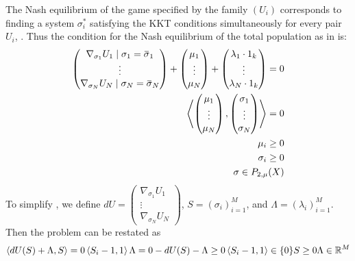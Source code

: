 The Nash equilibrium of the game specified by the family $(U_i)$ corresponds to finding a system $\sigma_i^*$ satisfying the KKT conditions simultaneously for every pair $U_i$, \citep{deimling2010nonlinear}. Thus the condition for the Nash equilibrium of the total population as in  is:
\begin{equation}
  \begin{split}
  \begin{pmatrix}
    \nabla_{\sigma_1} U_1 \mid{\sigma_1 = \overbar{\sigma}_1} \\
    \vdots \\
    \nabla_{\sigma_N} U_N \mid{\sigma_N = \overbar{\sigma}_N}
\end{pmatrix} + \begin{pmatrix}
    \mu_1 \\
    \vdots \\
    \mu_N
\end{pmatrix} + \begin{pmatrix}
    \lambda_1 \cdot 1_k \\
    \vdots \\
    \lambda_N \cdot 1_k
\end{pmatrix} = 0 \\
\ip{
\begin{pmatrix}
  \mu_1 \\
  \vdots \\
  \mu_N
\end{pmatrix}}{ \begin{pmatrix}
  \sigma_1 \\
  \vdots \\
  \sigma_N
\end{pmatrix}} = 0 \\
\mu_i \geq 0 \\
  \sigma_i \geq 0 \\
    \sigma \in P_{2,\mu}(X)
    \label{eq:KKT_total}
  \end{split}
\end{equation}
To simplify , we define $dU = \begin{pmatrix} \nabla_{\sigma_1} U_1 \\
    \vdots \\
    \nabla_{\sigma_N} U_N \end{pmatrix}$, $S=(\sigma_i)_{i=1}^M$, and $\Lambda = (\lambda_i)_{i=1}^M$. Then the problem can be restated as
\begin{equation}
  \label{eq:complementarity_form}
  \left \langle dU(S)+\Lambda,S \right \rangle = 0 \\
  \left \langle S_i-1,1 \right \rangle\Lambda = 0
  -dU(S)-\Lambda \geq 0 \\
  \left \langle S_i-1,1 \right \rangle \in \{0 \}
  S\geq 0
  \Lambda \in \mathbb{R}^M
\end{equation}
